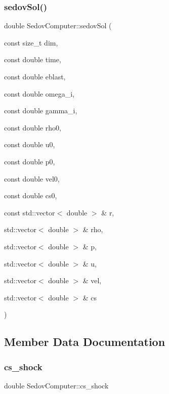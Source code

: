 \subsubsection{\texorpdfstring{sedov\+Sol()}{sedovSol()}}
{\footnotesize\ttfamily double Sedov\+Computer\+::sedov\+Sol (\begin{DoxyParamCaption}\item[{const size\+\_\+t}]{dim,  }\item[{const double}]{time,  }\item[{const double}]{eblast,  }\item[{const double}]{omega\+\_\+i,  }\item[{const double}]{gamma\+\_\+i,  }\item[{const double}]{rho0,  }\item[{const double}]{u0,  }\item[{const double}]{p0,  }\item[{const double}]{vel0,  }\item[{const double}]{cs0,  }\item[{const std\+::vector$<$ double $>$ \&}]{r,  }\item[{std\+::vector$<$ double $>$ \&}]{rho,  }\item[{std\+::vector$<$ double $>$ \&}]{p,  }\item[{std\+::vector$<$ double $>$ \&}]{u,  }\item[{std\+::vector$<$ double $>$ \&}]{vel,  }\item[{std\+::vector$<$ double $>$ \&}]{cs }\end{DoxyParamCaption})\hspace{0.3cm}{\ttfamily [static]}}



\subsection{Member Data Documentation}
\mbox{\label{classSedovComputer_afd12699016e5eb9bc8c2c42ca4fb00bd}} 
\subsubsection{\texorpdfstring{cs\+\_\+shock}{cs\_shock}}
{\footnotesize\ttfamily double Sedov\+Computer\+::cs\+\_\+shock\hspace{0.3cm}{\ttfamily [static]}}

